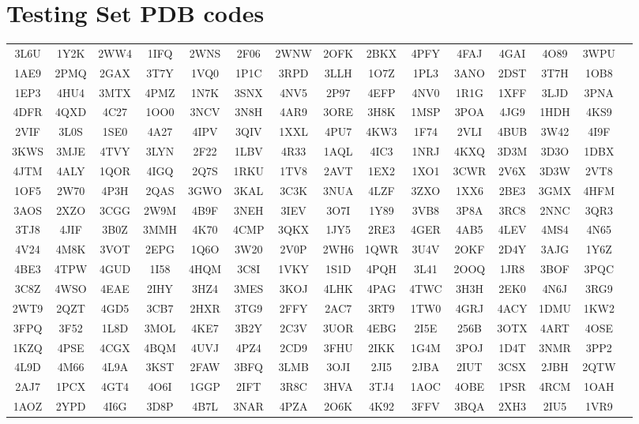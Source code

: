 \endgroup

\section{Testing Set PDB codes}

\begingroup
\fontsize{6pt}{8pt}\selectfont
\centering
	\begin{longtable}{ c c c c c c c c c c c c c c c }
	3L6U & 1Y2K & 2WW4 & 1IFQ & 2WNS & 2F06 & 2WNW & 2OFK & 2BKX & 4PFY & 4FAJ & 4GAI & 4O89 & 3WPU  \\
	1AE9 & 2PMQ & 2GAX & 3T7Y & 1VQ0 & 1P1C & 3RPD & 3LLH & 1O7Z & 1PL3 & 3ANO & 2DST & 3T7H & 1OB8  \\
	1EP3 & 4HU4 & 3MTX & 4PMZ & 1N7K & 3SNX & 4NV5 & 2P97 & 4EFP & 4NV0 & 1R1G & 1XFF & 3LJD & 3PNA  \\
	4DFR & 4QXD & 4C27 & 1OO0 & 3NCV & 3N8H & 4AR9 & 3ORE & 3H8K & 1MSP & 3POA & 4JG9 & 1HDH & 4KS9  \\
	2VIF & 3L0S & 1SE0 & 4A27 & 4IPV & 3QIV & 1XXL & 4PU7 & 4KW3 & 1F74 & 2VLI & 4BUB & 3W42 & 4I9F  \\
	3KWS & 3MJE & 4TVY & 3LYN & 2F22 & 1LBV & 4R33 & 1AQL & 4IC3 & 1NRJ & 4KXQ & 3D3M & 3D3O & 1DBX  \\
	4JTM & 4ALY & 1QOR & 4IGQ & 2Q7S & 1RKU & 1TV8 & 2AVT & 1EX2 & 1XO1 & 3CWR & 2V6X & 3D3W & 2VT8  \\
	1OF5 & 2W70 & 4P3H & 2QAS & 3GWO & 3KAL & 3C3K & 3NUA & 4LZF & 3ZXO & 1XX6 & 2BE3 & 3GMX & 4HFM  \\
	3AOS & 2XZO & 3CGG & 2W9M & 4B9F & 3NEH & 3IEV & 3O7I & 1Y89 & 3VB8 & 3P8A & 3RC8 & 2NNC & 3QR3  \\
	3TJ8 & 4JIF & 3B0Z & 3MMH & 4K70 & 4CMP & 3QKX & 1JY5 & 2RE3 & 4GER & 4AB5 & 4LEV & 4MS4 & 4N65  \\
	4V24 & 4M8K & 3VOT & 2EPG & 1Q6O & 3W20 & 2V0P & 2WH6 & 1QWR & 3U4V & 2OKF & 2D4Y & 3AJG & 1Y6Z  \\
	4BE3 & 4TPW & 4GUD & 1I58 & 4HQM & 3C8I & 1VKY & 1S1D & 4PQH & 3L41 & 2OOQ & 1JR8 & 3BOF & 3PQC  \\
	3C8Z & 4WSO & 4EAE & 2IHY & 3HZ4 & 3MES & 3KOJ & 4LHK & 4PAG & 4TWC & 3H3H & 2EK0 & 4N6J & 3RG9  \\
	2WT9 & 2QZT & 4GD5 & 3CB7 & 2HXR & 3TG9 & 2FFY & 2AC7 & 3RT9 & 1TW0 & 4GRJ & 4ACY & 1DMU & 1KW2  \\
	3FPQ & 3F52 & 1L8D & 3MOL & 4KE7 & 3B2Y & 2C3V & 3UOR & 4EBG & 2I5E & 256B & 3OTX & 4ART & 4OSE  \\
	1KZQ & 4PSE & 4CGX & 4BQM & 4UVJ & 4PZ4 & 2CD9 & 3FHU & 2IKK & 1G4M & 3POJ & 1D4T & 3NMR & 3PP2  \\
	4L9D & 4M66 & 4L9A & 3KST & 2FAW & 3BFQ & 3LMB & 3OJI & 2JI5 & 2JBA & 2IUT & 3CSX & 2JBH & 2QTW  \\
	2AJ7 & 1PCX & 4GT4 & 4O6I & 1GGP & 2IFT & 3R8C & 3HVA & 3TJ4 & 1AOC & 4OBE & 1PSR & 4RCM & 1OAH  \\
	1AOZ & 2YPD & 4I6G & 3D8P & 4B7L & 3NAR & 4PZA & 2O6K & 4K92 & 3FFV & 3BQA & 2XH3 & 2IU5 & 1VR9  \\
	\end{longtable}
\endgroup

